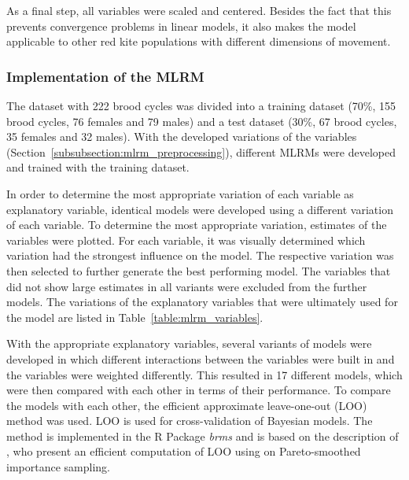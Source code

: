 As a final step, all variables were scaled and centered. Besides the fact that this prevents convergence problems in linear models, it also makes the model applicable to other red kite populations with different dimensions of movement.



\subsubsection{Implementation of the MLRM} \label{subsubsection:mlrm_implementation}
The dataset with 222 brood cycles was divided into a training dataset (70\%, 155 brood cycles, 76 females and 79 males) and a test dataset (30\%, 67 brood cycles, 35 females and 32 males). With the developed variations of the variables (Section~\ref{subsubsection:mlrm_preprocessing}), different MLRMs were developed and trained with the training dataset.

In order to determine the most appropriate variation of each variable as explanatory variable, identical models were developed using a different variation of each variable. To determine the most appropriate variation, estimates of the variables were plotted. For each variable, it was visually determined which variation had the strongest influence on the model. The respective variation was then selected to further generate the best performing model. The variables that did not show large estimates in all variants were excluded from the further models. The variations of the explanatory variables that were ultimately used for the model are listed in Table~\ref{table:mlrm_variables}.

With the appropriate explanatory variables, several variants of models were developed in which different interactions between the variables were built in and the variables were weighted differently. This resulted in 17 different models, which were then compared with each other in terms of their performance. To compare the models with each other, the efficient approximate leave-one-out (LOO) method was used. LOO is used for cross-validation of Bayesian models. The method is implemented in the R Package \textit{brms} and is based on the description of \textcite{vehtari2017practical}, who present an efficient computation of LOO using on Pareto-smoothed importance sampling.

